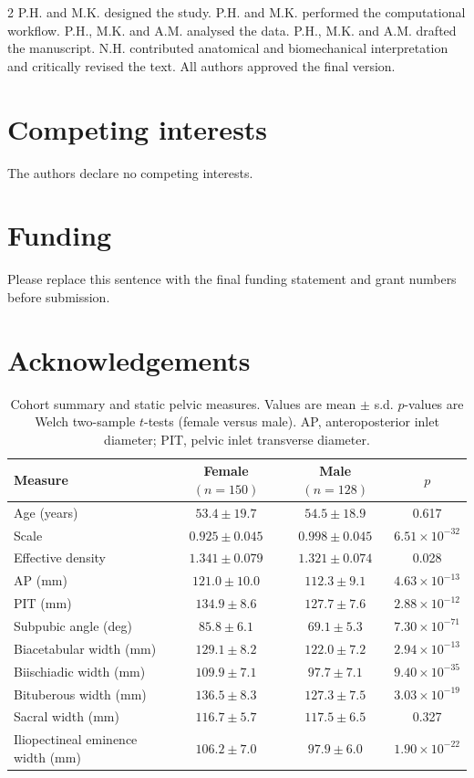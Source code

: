 \documentclass[openacc]{rsproca_new}
\begin{document}
\begin{multicols}{2}
P.H. and M.K. designed the study. P.H. and M.K. performed the computational workflow. P.H., M.K. and A.M. analysed the data. P.H., M.K. and A.M. drafted the manuscript. N.H. contributed anatomical and biomechanical interpretation and critically revised the text. All authors approved the final version.

\section*{Competing interests}

The authors declare no competing interests.

\section*{Funding}

Please replace this sentence with the final funding statement and grant numbers before submission.

\section*{Acknowledgements}



\end{multicols}

\begin{table}[p]
\centering
\caption{Cohort summary and static pelvic measures. Values are mean $\pm$ s.d. $p$-values are Welch two-sample $t$-tests (female versus male). AP, anteroposterior inlet diameter; PIT, pelvic inlet transverse diameter.}
\label{tab:cohort}
\begin{tabular}{lccc}
\toprule
Measure & Female $(n=150)$ & Male $(n=128)$ & $p$ \\
\midrule
Age (years) & $53.4 \pm 19.7$ & $54.5 \pm 18.9$ & 0.617 \\
Scale & $0.925 \pm 0.045$ & $0.998 \pm 0.045$ & $6.51 \times 10^{-32}$ \\
Effective density & $1.341 \pm 0.079$ & $1.321 \pm 0.074$ & 0.028 \\
AP (mm) & $121.0 \pm 10.0$ & $112.3 \pm 9.1$ & $4.63 \times 10^{-13}$ \\
PIT (mm) & $134.9 \pm 8.6$ & $127.7 \pm 7.6$ & $2.88 \times 10^{-12}$ \\
Subpubic angle (deg) & $85.8 \pm 6.1$ & $69.1 \pm 5.3$ & $7.30 \times 10^{-71}$ \\
Biacetabular width (mm) & $129.1 \pm 8.2$ & $122.0 \pm 7.2$ & $2.94 \times 10^{-13}$ \\
Biischiadic width (mm) & $109.9 \pm 7.1$ & $97.7 \pm 7.1$ & $9.40 \times 10^{-35}$ \\
Bituberous width (mm) & $136.5 \pm 8.3$ & $127.3 \pm 7.5$ & $3.03 \times 10^{-19}$ \\
Sacral width (mm) & $116.7 \pm 5.7$ & $117.5 \pm 6.5$ & 0.327 \\
Iliopectineal eminence width (mm) & $106.2 \pm 7.0$ & $97.9 \pm 6.0$ & $1.90 \times 10^{-22}$ \\
\bottomrule
\end{tabular}
\end{table}
\end{document}
